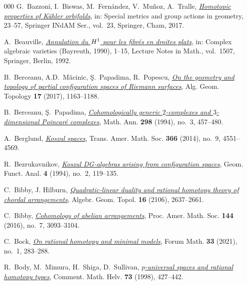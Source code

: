 \documentclass{article}
\numberwithin{equation}{section}
\theoremstyle{definition}
\begin{document}
\begin{thebibliography}{000}
 G.~Bazzoni, I.~Biswas, M.~Fern\'{a}ndez, V.~Mu\~{n}oz, A.~Tralle, 
\href{https://dx.doi.org/10.1007/978-3-319-67519-0_2}%
{\em Homotopic properties of {K}\"{a}hler orbifolds},  in: Special metrics and group 
actions in geometry, 23--57, Springer INdAM Ser., vol.~23, Springer, Cham, 2017. 

 A.~Beauville, 
\href{https://dx.doi.org/10.1007/BFb0094507}%
{\em Annulation du $H\sp 1$ pour les fibr\' es en droites plats}, in: 
Complex algebraic varieties (Bayreuth, 1990), 1--15,
Lecture Notes in Math., vol.~1507, Springer, Berlin, 1992. 

  B.~Berceanu, A.D.~M\u{a}cinic, \c{S}.~Papadima,  R.~Popescu,  
 \href{https://dx.doi.org/10.2140/agt.2017.17.1163}%
{\em On the geometry and topology of partial configuration 
spaces of Riemann surfaces},  Alg. Geom. Topology \textbf{17} 
(2017), 1163--1188.

 B.~Berceanu, \c{S}.~Papadima, 
\href{https://dx.doi.org/10.1007/BF01459745}%
{\em Cohomologically generic $2$-complexes and 
$3$-dimensional {P}oin\-car\'{e} complexes},  
Math. Ann. \textbf{298} (1994), no.~3, 457--480. 

 A.~Berglund, 
\href{https://dx.doi.org/10.1090/S0002-9947-2014-05935-7}%
{\em Koszul spaces}, Trans. Amer. Math. Soc. 
\textbf{366} (2014), no.~9, 4551--4569. 

 R.~Bezrukavnikov, 
\href{https://dx.doi.org/10.1007/BF01895836}%
{\em Koszul {DG}-algebras arising from configuration spaces}, 
Geom. Funct. Anal. \textbf{4} (1994), no.~2, 119--135. 

   C.~Bibby, J. Hilburn, 
\href{https://dx.doi.org/10.2140/agt.2016.16.2637}%
{\em Quadratic-linear duality and rational homotopy theory 
of chordal arrangements}, Algebr. Geom. Topol. \textbf{16} 
(2106), 2637--2661.

  C.~Bibby, 
\href{https://dx.doi.org/10.1090/proc/12937}%
{\em Cohomology of abelian arrangements}, Proc. Amer. Math. Soc. 
\textbf{144} (2016), no.~7, 3093--3104. 

 C.~Bock,
\href{https://dx.doi.org/10.1515/forum-2020-0123}%
{\em  On rational homotopy and minimal models},
Forum Math. \textbf{33} (2021), no.~1, 283--288.

 R.~Body, M.~Mimura, H.~Shiga, D.~Sullivan,
\href{https://dx.doi.org/10.1007/s000140050063}%
{\em $p$-universal spaces and rational homotopy types},
Comment. Math. Helv. \textbf{73} (1998), 427--442.


\end{thebibliography}
\end{document}
